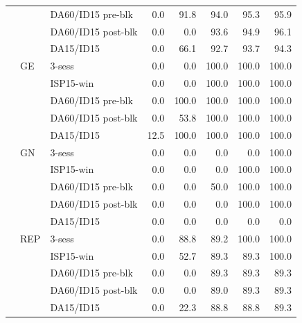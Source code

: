 \begin{tabular}{l l l r r r r r}
 &  & DA60/ID15 pre-blk & 0.0 & 91.8 & 94.0 & 95.3 & 95.9 \\
 &  & DA60/ID15 post-blk & 0.0 & 0.0 & 93.6 & 94.9 & 96.1 \\
 &  & DA15/ID15 & 0.0 & 66.1 & 92.7 & 93.7 & 94.3 \\
 & GE & 3-sess & 0.0 & 0.0 & 100.0 & 100.0 & 100.0 \\
 &  & ISP15-win & 0.0 & 0.0 & 100.0 & 100.0 & 100.0 \\
 &  & DA60/ID15 pre-blk & 0.0 & 100.0 & 100.0 & 100.0 & 100.0 \\
 &  & DA60/ID15 post-blk & 0.0 & 53.8 & 100.0 & 100.0 & 100.0 \\
 &  & DA15/ID15 & 12.5 & 100.0 & 100.0 & 100.0 & 100.0 \\
 & GN & 3-sess & 0.0 & 0.0 & 0.0 & 0.0 & 100.0 \\
 &  & ISP15-win & 0.0 & 0.0 & 0.0 & 100.0 & 100.0 \\
 &  & DA60/ID15 pre-blk & 0.0 & 0.0 & 50.0 & 100.0 & 100.0 \\
 &  & DA60/ID15 post-blk & 0.0 & 0.0 & 0.0 & 100.0 & 100.0 \\
 &  & DA15/ID15 & 0.0 & 0.0 & 0.0 & 0.0 & 0.0 \\
 & REP & 3-sess & 0.0 & 88.8 & 89.2 & 100.0 & 100.0 \\
 &  & ISP15-win & 0.0 & 52.7 & 89.3 & 89.3 & 100.0 \\
 &  & DA60/ID15 pre-blk & 0.0 & 0.0 & 89.3 & 89.3 & 89.3 \\
 &  & DA60/ID15 post-blk & 0.0 & 0.0 & 89.0 & 89.3 & 89.3 \\
 &  & DA15/ID15 & 0.0 & 22.3 & 88.8 & 88.8 & 89.3 \\
\bottomrule
\end{tabular}